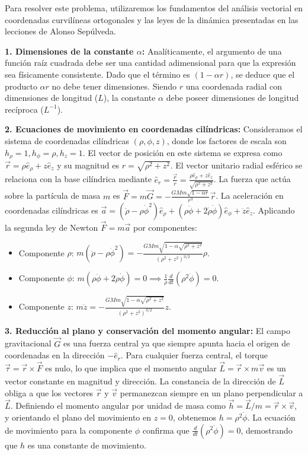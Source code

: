 \documentclass[a4paper]{article}
\begin{document}
Para resolver este problema, utilizaremos los fundamentos del análisis vectorial en coordenadas curvilíneas ortogonales y las leyes de la dinámica presentadas en las lecciones de Alonso Sepúlveda.

\textbf{1. Dimensiones de la constante $\alpha$:}
Analíticamente, el argumento de una función raíz cuadrada debe ser una cantidad adimensional para que la expresión sea físicamente consistente. Dado que el término es $(1 - \alpha r)$, se deduce que el producto $\alpha r$ no debe tener dimensiones. Siendo $r$ una coordenada radial con dimensiones de longitud ($L$), la constante $\alpha$ debe poseer dimensiones de longitud recíproca ($L^{-1}$).

\textbf{2. Ecuaciones de movimiento en coordenadas cilíndricas:}
Consideramos el sistema de coordenadas cilíndricas $(\rho, \phi, z)$, donde los factores de escala son $h_\rho = 1, h_\phi = \rho, h_z = 1$. El vector de posición en este sistema se expresa como $\vec{r} = \rho \hat{e}_\rho + z \hat{e}_z$ y su magnitud es $r = \sqrt{\rho^2 + z^2}$. El vector unitario radial esférico se relaciona con la base cilíndrica mediante $\hat{e}_r = \frac{\vec{r}}{r} = \frac{\rho \hat{e}_\rho + z \hat{e}_z}{\sqrt{\rho^2 + z^2}}$. La fuerza que actúa sobre la partícula de masa $m$ es $\vec{F} = m\vec{G} = -\frac{GMm\sqrt{1-\alpha r}}{r^3} \vec{r}$. La aceleración en coordenadas cilíndricas es $\vec{a} = (\ddot{\rho} - \rho\dot{\phi}^2)\hat{e}_\rho + (\rho\ddot{\phi} + 2\dot{\rho}\dot{\phi})\hat{e}_\phi + \ddot{z}\hat{e}_z$. Aplicando la segunda ley de Newton $\vec{F} = m\vec{a}$ por componentes:
\begin{itemize}
    \item Componente $\rho$: $m(\ddot{\rho} - \rho\dot{\phi}^2) = -\frac{GMm\sqrt{1-\alpha\sqrt{\rho^2 + z^2}}}{(\rho^2 + z^2)^{3/2}} \rho$.
    \item Componente $\phi$: $m(\rho\ddot{\phi} + 2\dot{\rho}\dot{\phi}) = 0 \implies \frac{1}{\rho}\frac{d}{dt}(\rho^2\dot{\phi}) = 0$.
    \item Componente $z$: $m\ddot{z} = -\frac{GMm\sqrt{1-\alpha\sqrt{\rho^2 + z^2}}}{(\rho^2 + z^2)^{3/2}} z$.
\end{itemize}

\textbf{3. Reducción al plano y conservación del momento angular:}
El campo gravitacional $\vec{G}$ es una fuerza central ya que siempre apunta hacia el origen de coordenadas en la dirección $-\hat{e}_r$. Para cualquier fuerza central, el torque $\vec{\tau} = \vec{r} \times \vec{F}$ es nulo, lo que implica que el momento angular $\vec{L} = \vec{r} \times m\vec{v}$ es un vector constante en magnitud y dirección. La constancia de la dirección de $\vec{L}$ obliga a que los vectores $\vec{r}$ y $\vec{v}$ permanezcan siempre en un plano perpendicular a $\vec{L}$. Definiendo el momento angular por unidad de masa como $\vec{h} = \vec{L}/m = \vec{r} \times \vec{v}$, y orientando el plano del movimiento en $z=0$, obtenemos $h = \rho^2 \dot{\phi}$. La ecuación de movimiento para la componente $\phi$ confirma que $\frac{d}{dt}(\rho^2 \dot{\phi}) = 0$, demostrando que $h$ es una constante de movimiento.
\end{document}
